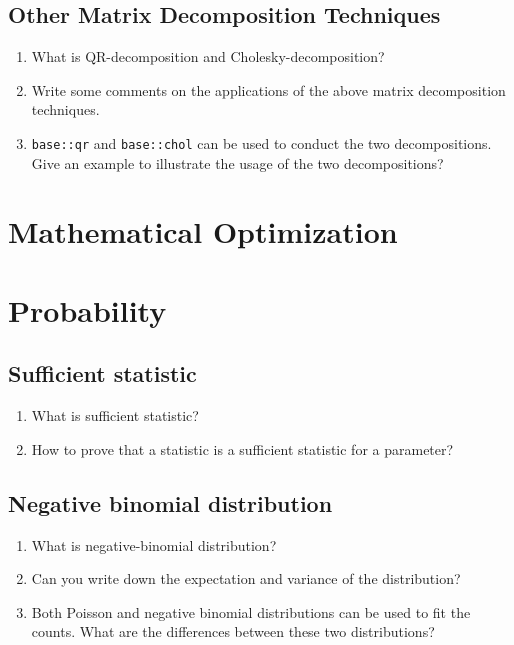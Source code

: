 \documentclass[11pt,a4paper]{article}
\begin{document}
\begin{CJK*}{UTF8}{gbsn}
\subsection{Other Matrix Decomposition Techniques}
\begin{enumerate}[(1)]
    \item What is QR-decomposition and Cholesky-decomposition?
    \item Write some comments on the applications of the above 
        matrix decomposition techniques.
    \item \texttt{base::qr} and \texttt{base::chol} can be used 
        to conduct the two decompositions. Give an example to 
        illustrate the usage of the two decompositions?
\end{enumerate}

\section{Mathematical Optimization}



\section{Probability}

\subsection{Sufficient statistic}
\begin{enumerate}[(1)]
    \item What is sufficient statistic?
    \item How to prove that a statistic is a sufficient statistic for a 
        parameter?
\end{enumerate}

\subsection{Negative binomial distribution}
\begin{enumerate}[(1)]
    \item What is negative-binomial distribution?
    \item Can you write down the expectation and variance of the distribution?
    \item Both Poisson and negative binomial distributions can be used to fit 
        the counts. What are the differences between these two distributions?
\end{enumerate}


\end{CJK*}
\end{document}
